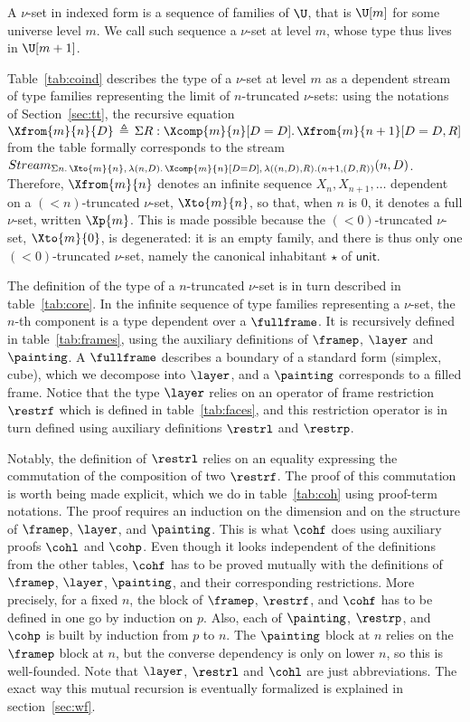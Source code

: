 \documentclass{msc}
\newcommand{\unittype}{\ensuremath{\mathsf{unit}}}
\newcommand{\defeq}{\ensuremath{\triangleq}}
\renewcommand{\D}{D}
\newcommand{\pair}[2]{#1, #2}
\newcommand{\kstar}{{\star}}
\begin{document}
A $\nu$-set in indexed form is a sequence of families of $\U$, that is $\U[m]$ for some universe level $m$. We call such sequence a $\nu$-set at level $m$, whose type thus lives in $\U[m+1]$.

Table~\ref{tab:coind} describes the type of a $\nu$-set at level $m$ as a dependent stream of type families representing the limit of $n$-truncated $\nu$-sets: using the notations of Section~\ref{sec:tt}, the recursive equation $\Xfrom{m}{n}{D} \,\defeq\, \Sigma R: \Xcomp{m}{n}[D=\D].\, \Xfrom{m}{n+1}[D=\pair{D}{R}]$ from the table formally corresponds to the stream $Stream_{\Sigma n.\, \Xto{m}{n},\, \lambda (n, \D).\, \Xcomp{m}{n}[D=\D],\,\lambda ((n, D),R).(n+1,(\pair{D}{R}))}(n, \D)$. Therefore, $\Xfrom{m}{n}$ denotes an infinite sequence $X_{n}, X_{n+1}, \ldots$ dependent on a $(<n)$-truncated $\nu$-set, $\Xto{m}{n}$, so that, when $n$ is $0$, it denotes a full $\nu$-set, written $\Xp{m}$. This is made possible because the $(<0)$-truncated $\nu$-set, $\Xto{m}{0}$, is degenerated: it is an empty family, and there is thus only one $(<0)$-truncated $\nu$-set, namely the canonical inhabitant $\kstar$ of $\unittype$.

The definition of the type of a $n$-truncated $\nu$-set is in turn described in table~\ref{tab:core}. In the infinite sequence of type families representing a $\nu$-set, the $n$-th component is a type dependent over a $\fullframe$. It is recursively defined in table~\ref{tab:frames}, using the auxiliary definitions of $\framep$, $\layer$ and $\painting$. A $\fullframe$ describes a boundary of a standard form (simplex, cube), which we decompose into $\layer$, and a $\painting$ corresponds to a filled frame. Notice that the type $\layer$ relies on an operator of frame restriction $\restrf$ which is defined in table~\ref{tab:faces}, and this restriction operator is in turn defined using auxiliary definitions $\restrl$ and $\restrp$.

Notably, the definition of $\restrl$ relies on an equality expressing the commutation of the composition of two $\restrf$. The proof of this commutation is worth being made explicit, which we do in table~\ref{tab:coh} using proof-term notations. The proof requires an induction on the dimension and on the structure of $\framep$, $\layer$, and $\painting$. This is what $\cohf$ does using auxiliary proofs $\cohl$ and $\cohp$. Even though it looks independent of the definitions from the other tables, $\cohf$ has to be proved mutually with the definitions of $\framep$, $\layer$, $\painting$, and their corresponding restrictions. More precisely, for a fixed $n$, the block of $\framep$, $\restrf$, and $\cohf$ has to be defined in one go by induction on $p$. Also, each of $\painting$, $\restrp$, and $\cohp$ is built by induction from $p$ to $n$. The $\painting$ block at $n$ relies on the $\framep$ block at $n$, but the converse dependency is only on lower $n$, so this is well-founded. Note that $\layer$, $\restrl$ and $\cohl$ are just abbreviations. The exact way this mutual recursion is eventually formalized is explained in section~\ref{sec:wf}.
\end{document}
